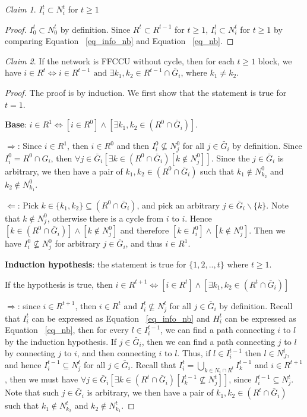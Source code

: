 \documentclass[12pt,letter]{article}
\theoremstyle{definition}
\theoremstyle{remark}
\theoremstyle{claim}
\newtheorem{claim}{Claim}
\begin{document}
\begin{claim}
\label{lemma_I_subset_N}
$I^t_i\subset N^t_i$ for $t\geq 1$
\end{claim}
\begin{proof}
$I^t_0\subset N^t_0$ by definition. Since $R^t\subset R^{t-1}$ for $t\geq 1$, $I^t_i\subset N^t_i$ for $t\geq 1$ by comparing Equation ~\ref{eq_info_nb} and Equation ~\ref{eq_nb}.
\end{proof}

\begin{claim}
\label{lemma1}
If the network is FFCCU without cycle, then for each $t\geq 1$ block, we have $i\in R^t\Leftrightarrow i\in R^{t-1} \text{ and } \exists k_1,k_2\in R^{t-1}\cap \bar{G}_i$, where $k_1\neq k_2$.
\end{claim}
\begin{proof}
The proof is by induction. We first show that the statement is true for $t=1$. 

\textbf{Base}: $i\in R^1\Leftrightarrow [i\in R^0] \wedge [\exists k_1,k_2\in (R^0\cap \bar{G}_i)]$. 

$\Rightarrow$: Since $i\in R^1$, then $i\in R^0$ and then $I^0_i\nsubseteq N^0_j$ for all $j\in \bar{G}_i$ by definition. Since $I^0_i=R^0\cap G_i$, then $\forall j\in \bar{G}_i [\exists k\in (R^0\cap \bar{G}_i) [k\notin N^0_j]]$. Since the $j\in \bar{G}_i$ is arbitrary,  we then have a pair of $k_1, k_2 \in (R^0\cap \bar{G}_i)$ such that $k_1\notin N^0_{k_2}$ and $k_2\notin N^0_{k_1}$.

$\Leftarrow$: Pick $k\in \{k_1,k_2\}\subseteq (R^0\cap \bar{G}_i)$, and pick an arbitrary $j\in \bar{G}_i\backslash \{k\}$. Note that $k\notin N^0_j$, otherwise there is a cycle from $i$ to $i$. Hence $[k\in (R^0\cap \bar{G}_i)] \wedge [k\notin N^0_j]$ and therefore $[k\in I^0_i] \wedge [k\notin N^0_j]$. Then we have $I^0_i\nsubseteq N^0_j$ for arbitrary $j\in \bar{G}_i$, and thus $i\in R^1$.

\textbf{Induction hypothesis}: the statement is true for $\{1,2,..,t\}$ where $t\geq 1$. 


If the hypothesis is true, then $i\in R^{t+1}\Leftrightarrow [i\in R^{t}] \wedge [\exists k_1,k_2\in (R^{t}\cap \bar{G}_i)]$


$\Rightarrow$: since $i\in R^{t+1}$, then $i\in R^t$ and $I^t_i\nsubseteq N^t_j$ for all $j\in \bar{G}_i$ by definition. Recall that $I^t_i$ can be expressed as Equation ~\ref{eq_info_nb} and $H^t_i$ can be expressed as Equation ~\ref{eq_nb}, then for every $l\in I^{t-1}_i$, we can find a path connecting $i$ to $l$ by the induction hypothesis. If $j\in \bar{G}_i$, then we can find a path connecting $j$ to $l$ by connecting $j$ to $i$, and then connecting $i$ to $l$. Thus, if $l\in I^{t-1}_i$ then $l\in N^t_J$, and hence $I^{t-1}_i\subseteq N^t_{j}$ for all $j\in \bar{G}_i$. Recall that $I^t_i = \bigcup_{k\in N_i\cap R^t}I^{t-1}_k$ and $i\in R^{t+1}$, then we must have $\forall j\in \bar{G}_i [\exists k\in (R^t\cap \bar{G}_i)[ I^{t-1}_k\nsubseteq N^t_j]]$, since $I^{t-1}_i\subseteq N^t_{j}$. Note that such $j\in \bar{G}_i$ is arbitrary,  we then have a pair of $k_1, k_2 \in (R^{t}\cap \bar{G}_i)$ such that $k_1\notin N^t_{k_2}$ and $k_2\notin N^t_{k_1}$.
\bigskip


\end{proof}
\end{document}
